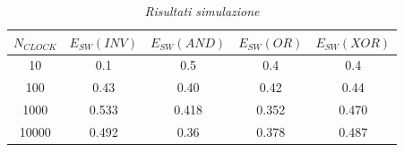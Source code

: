 \begin{table}[!h]\footnotesize
	\centering
	\begin{tabular}{|c|c|c|c|c|}
		\hline
		\textbf{$N_{CLOCK}$} & \textbf{$E_{SW}(INV)$}& \textbf{$E_{SW}(AND)$}& \textbf{$E_{SW}(OR)$} &\textbf{$E_{SW}(XOR)$}\\
		\hline
		10 & 0.1  & 0.5& 0.4&0.4\\
		\hline
		100 &  0.43 &0.40&0.42& 0.44\\
		\hline
		1000& 0.533& 0.418&0.352&0.470\\
		\hline
		10000& 0.492& 0.36&0.378&0.487\\
		\hline
	\end{tabular}
	\caption{\textit{Risultati simulazione}}
	\label{Tab1_2}
\end{table}\\

